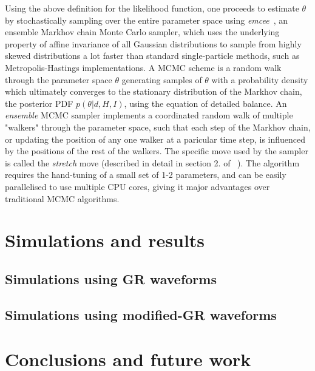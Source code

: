\documentclass[prd,preprintnumbers,twocolumn,eqsecnum,floatfix,a4paper,nofootinbib,superscriptaddress]{revtex4}
\begin{document}
Using the above definition for the likelihood function, one proceeds to estimate $\theta$ by stochastically sampling over the entire parameter space using  \emph{emcee}~\cite{goodman2010ensemble,foreman2013emcee}, an ensemble Markhov chain Monte Carlo sampler, which uses the underlying property of affine invariance of all Gaussian distributions to sample from highly skewed distributions a lot faster than standard single-particle methods, such as Metropolis-Hastings implementations. A MCMC scheme is a random walk through the parameter space $\theta$ generating samples of $\theta$ with a probability density which ultimately converges to the stationary distribution of the Markhov chain, the posterior PDF $p(\theta|d, H, I)$, using the equation of detailed balance. An \emph{ensemble} MCMC sampler implements a coordinated random walk of multiple "walkers" through the parameter space, such that each step of the Markhov chain, or updating the position of any one walker at a paricular time step, is influenced by the positions of the rest of the walkers. The specific move used by the sampler is called the \emph{stretch} move (described in detail in section 2. of ~\cite{goodman2010ensemble}). The algorithm requires the hand-tuning of a small set of 1-2 parameters, and can be easily parallelised to use multiple CPU cores, giving it major advantages over traditional MCMC algorithms.

\section{Simulations and results}
\subsection{Simulations using GR waveforms}
\subsection{Simulations using modified-GR waveforms}
\section{Conclusions and future work}
%
%


\end{document}
